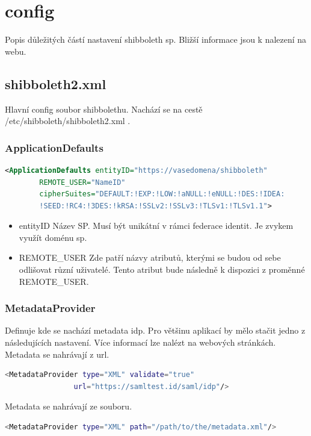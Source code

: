 \chapter{config}
Popis důležitých částí nastavení shibboleth sp. Bližší informace jsou k nalezení na webu\cite{SPconfig}. 

\section{shibboleth2.xml}
Hlavní config soubor shibbolethu. Nachází se na cestě /etc/shibboleth/shibboleth2.xml .

\subsection{ApplicationDefaults}
\begin{lstlisting}[language=xml]
<ApplicationDefaults entityID="https://vasedomena/shibboleth"
        REMOTE_USER="NameID"
        cipherSuites="DEFAULT:!EXP:!LOW:!aNULL:!eNULL:!DES:!IDEA:
        !SEED:!RC4:!3DES:!kRSA:!SSLv2:!SSLv3:!TLSv1:!TLSv1.1">
\end{lstlisting}
\begin{itemize}
    \item entityID \linebreak
    Název SP. Musí být unikátní v rámci federace identit. Je zvykem využít doménu sp.  
    \item REMOTE\_USER \linebreak
    Zde patří názvy atributů, kterými se budou od sebe odlišovat různí uživatelé. 
    Tento atribut bude následně k dispozici z proměnné REMOTE\_USER.
\end{itemize}
\subsection{MetadataProvider}
Definuje kde se nachází metadata idp. Pro většinu aplikací by mělo stačit jedno z následujících nastavení. Více informací lze nalézt na webových stránkách\cite{MetadataProvider}.
\linebreak \linebreak
Metadata se nahrávají z url.
\begin{lstlisting}[language=Bash]
 <MetadataProvider type="XML" validate="true"
                url="https://samltest.id/saml/idp"/>
\end{lstlisting}
Metadata se nahrávají ze souboru.
\begin{lstlisting}[language=Bash]
 <MetadataProvider type="XML" path="/path/to/the/metadata.xml"/>
\end{lstlisting}


